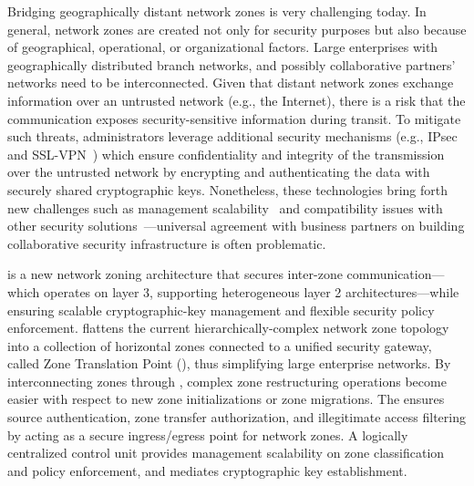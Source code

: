 Bridging geographically distant network zones is very challenging today. In general,
network zones are created not only for security purposes but also because of geographical,
operational, or organizational factors. Large enterprises with geographically distributed
branch networks, and possibly collaborative partners' networks need to be interconnected.
Given that distant network zones exchange information over an untrusted
network (e.g., the Internet), there is a risk that the communication exposes security-sensitive
information during transit. To mitigate
such threats, administrators leverage additional security mechanisms (e.g.,
IPsec~\cite{rfc4301} and SSL-VPN~\cite{sun2011advantages})
which ensure confidentiality
and integrity of the transmission over the untrusted network by encrypting and authenticating the data with
securely shared cryptographic keys. Nonetheless, these technologies bring forth new challenges
such as management scalability~\cite{felsch2018dangers} and compatibility issues with other
security solutions~\cite{liu2008collaborative}---universal agreement with business partners on building collaborative security infrastructure is often problematic.


\name is a new network zoning architecture that secures inter-zone communication---which
operates on layer 3, supporting heterogeneous layer 2 architectures---while ensuring
scalable cryptographic-key management and flexible security policy enforcement.
\name flattens the current hierarchically-complex network zone topology into a collection of
horizontal zones connected to a unified security gateway, called Zone Translation Point
(\tp), thus simplifying large enterprise networks.
By interconnecting zones through \tps, complex zone restructuring operations become
easier with respect to new zone initializations or zone migrations.
The \tp ensures source authentication, zone transfer authorization, and illegitimate access filtering by
acting as a secure ingress/egress point for network zones. A logically centralized control unit provides
management scalability on zone classification and policy enforcement, and mediates cryptographic key
establishment.

